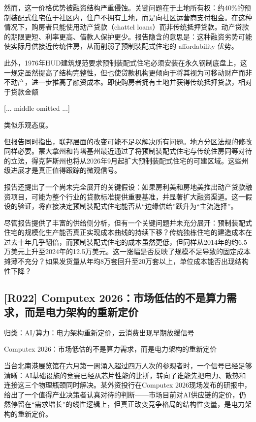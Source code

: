 \documentclass[11pt]{ctexart}
\begin{document}
然而，这一价格优势被融资结构严重侵蚀。关键问题在于土地所有权：约40\%的预制装配式住宅位于社区内，住户不拥有土地，而是向社区运营商支付租金。在这种情况下，购房者只能使用动产贷款（chattel loans）而非传统抵押贷款。动产贷款的期限更短、利率更高、借款人保护更少。报告隐含的意思是：这种融资劣势可能使实际月供接近传统住房，从而削弱了预制装配式住宅的 affordability 优势。

此外，1976年HUD建筑规范要求预制装配式住宅必须安装在永久钢制底盘上，这一规定虽然提高了结构完整性，但也使贷款机构更倾向于将其视为可移动财产而非不动产，进一步推高了融资成本。即使购房者拥有土地并获得传统抵押贷款，相对于贷款金额

[... middle omitted ...]

类似乐观态度。

但报告同时指出，联邦层面的改变可能不足以解决所有问题。地方分区法规的修改同样必要。蒙大拿州和肯塔基州最近通过了将预制装配式住宅与传统住房同等对待的立法，得克萨斯州也将从2026年9月起扩大预制装配式住宅的可建区域。这些州级进展才是真正值得跟踪的微观信号。

报告还提出了一个尚未完全展开的关键假设：如果房利美和房地美推出动产贷款融资项目，可能为整个行业的贷款标准提供重要基准，并显著扩大融资渠道。这一假设的验证，将直接决定预制装配式住宅能否从“边缘供给”跃升为“主流选择”。

尽管报告提供了丰富的供给侧分析，但有一个关键问题并未充分展开：预制装配式住宅的规模化生产能否真正实现成本曲线的持续下移？传统独栋住宅的建造成本在过去十年几乎翻倍，而预制装配式住宅的成本虽然更低，但同样从2014年的约6.5万美元上升至2024年的12.5万美元。这一涨幅是否反映了规模不足导致的固定成本摊薄不充分？如果发货量从年均8万套回升至20万套以上，单位成本能否出现结构性下降？

\subsection{[R022] Computex 2026：市场低估的不是算力需求，而是电力架构的重新定价}
{\small\color{refgray}归类：AI/算力：电力架构重新定价，云消费出现早期放缓信号}

Computex 2026：市场低估的不是算力需求，而是电力架构的重新定价

当台北南港展览馆在六月第一周涌入超过四万人次的参观者时，一个信号已经足够清晰：AI基础设施的竞赛已经从芯片性能的比拼，转向了谁能先把电力、散热和连接这三个物理瓶颈同时解决。某外资投行在Computex 2026现场发布的研报中，给出了一个值得产业决策者认真对待的判断——市场目前对AI供应链的定价，仍然停留在“需求增长”的线性逻辑上，但真正改变竞争格局的结构性变量，是电力架构的重新定价。
\end{document}
